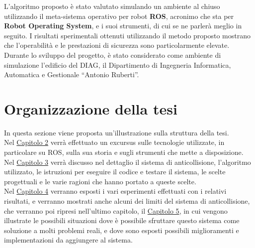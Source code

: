 L'algoritmo proposto è stato valutato simulando un ambiente al chiuso utilizzando il meta-sistema operativo per robot \textbf{ROS}, acronimo che sta per \textbf{Robot Operating System}, e i suoi strumenti, di cui se ne parlerà meglio in seguito. I risultati sperimentali ottenuti utilizzando il metodo proposto mostrano che l'operabilità e le prestazioni di sicurezza sono particolarmente elevate. Durante lo sviluppo del progetto, è stato considerato come ambiente di simulazione l'edificio del DIAG, il Dipartimento di Ingegneria Informatica, Automatica e Gestionale ``Antonio Ruberti''.

\section{Organizzazione della tesi}

In questa sezione viene proposta un'illustrazione sulla struttura della tesi.\\
Nel \hyperref[cap:ROS]{Capitolo 2} verrà effettuato un excursus sulle tecnologie utilizzate, in particolare su ROS, sulla sua storia e sugli strumenti che mette a disposizione.\\ Nel \hyperref[descrizione]{Capitolo 3} verrà discusso nel dettaglio il sistema di anticollisione, l’algoritmo utilizzato, le istruzioni per eseguire il codice e testare il sistema, le scelte progettuali e le varie ragioni che hanno portato a queste scelte.\\
Nel \hyperref[esperimenti]{Capitolo 4} verranno esposti i vari esperimenti effettuati con i relativi risultati, e verranno mostrati anche alcuni dei limiti del sistema di anticollisione, che verranno poi ripresi nell'ultimo capitolo, il \hyperref[Conclusioni]{Capitolo 5}, in cui vengono illustrate le possibili situazioni dove è possibile sfruttare questo sistema come soluzione a molti problemi reali, e dove sono esposti possibili miglioramenti e implementazioni da aggiungere al sistema.